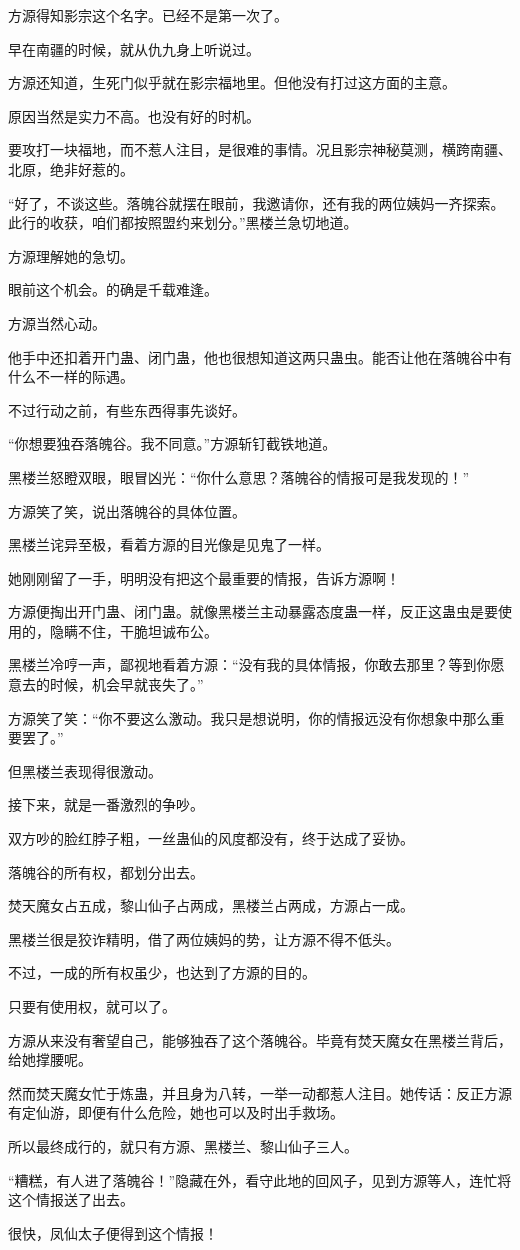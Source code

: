 \begin{this_body}
方源得知影宗这个名字。已经不是第一次了。

早在南疆的时候，就从仇九身上听说过。

方源还知道，生死门似乎就在影宗福地里。但他没有打过这方面的主意。

原因当然是实力不高。也没有好的时机。

要攻打一块福地，而不惹人注目，是很难的事情。况且影宗神秘莫测，横跨南疆、北原，绝非好惹的。

“好了，不谈这些。落魄谷就摆在眼前，我邀请你，还有我的两位姨妈一齐探索。此行的收获，咱们都按照盟约来划分。”黑楼兰急切地道。

方源理解她的急切。

眼前这个机会。的确是千载难逢。

方源当然心动。

他手中还扣着开门蛊、闭门蛊，他也很想知道这两只蛊虫。能否让他在落魄谷中有什么不一样的际遇。

不过行动之前，有些东西得事先谈好。

“你想要独吞落魄谷。我不同意。”方源斩钉截铁地道。

黑楼兰怒瞪双眼，眼冒凶光：“你什么意思？落魄谷的情报可是我发现的！”

方源笑了笑，说出落魄谷的具体位置。

黑楼兰诧异至极，看着方源的目光像是见鬼了一样。

她刚刚留了一手，明明没有把这个最重要的情报，告诉方源啊！

方源便掏出开门蛊、闭门蛊。就像黑楼兰主动暴露态度蛊一样，反正这蛊虫是要使用的，隐瞒不住，干脆坦诚布公。

黑楼兰冷哼一声，鄙视地看着方源：“没有我的具体情报，你敢去那里？等到你愿意去的时候，机会早就丧失了。”

方源笑了笑：“你不要这么激动。我只是想说明，你的情报远没有你想象中那么重要罢了。”

但黑楼兰表现得很激动。

接下来，就是一番激烈的争吵。

双方吵的脸红脖子粗，一丝蛊仙的风度都没有，终于达成了妥协。

落魄谷的所有权，都划分出去。

焚天魔女占五成，黎山仙子占两成，黑楼兰占两成，方源占一成。

黑楼兰很是狡诈精明，借了两位姨妈的势，让方源不得不低头。

不过，一成的所有权虽少，也达到了方源的目的。

只要有使用权，就可以了。

方源从来没有奢望自己，能够独吞了这个落魄谷。毕竟有焚天魔女在黑楼兰背后，给她撑腰呢。

然而焚天魔女忙于炼蛊，并且身为八转，一举一动都惹人注目。她传话：反正方源有定仙游，即便有什么危险，她也可以及时出手救场。

所以最终成行的，就只有方源、黑楼兰、黎山仙子三人。

“糟糕，有人进了落魄谷！”隐藏在外，看守此地的回风子，见到方源等人，连忙将这个情报送了出去。

很快，凤仙太子便得到这个情报！

\end{this_body}

